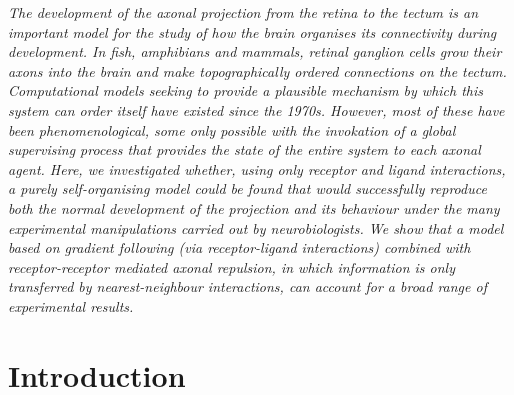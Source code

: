 \documentclass[11pt, a4paper, draft]{article}
\begin{document}

\emph{The development of the axonal projection from the retina to the tectum
is an important model for the study of how the brain organises its
connectivity during development. In fish, amphibians and mammals, retinal
ganglion cells grow their axons into the brain and make topographically
ordered connections on the tectum.
%
Computational models seeking to provide a plausible mechanism by which this
system can order itself have existed since the 1970s. However, most of these
have been phenomenological, some only possible with the invokation of a global
supervising process that provides the state of the entire system to each
axonal agent.
%
Here, we investigated whether, using only receptor and ligand interactions, a
purely self-organising model could be found that would successfully reproduce
both the normal development of the projection and its behaviour under the many
experimental manipulations carried out by neurobiologists.
%
We show that a model based on gradient following (via receptor-ligand
interactions) combined with receptor-receptor mediated axonal repulsion, in
which information is only transferred by nearest-neighbour interactions, can
account for a broad range of experimental results.
}

\section{Introduction}
\end{document}
